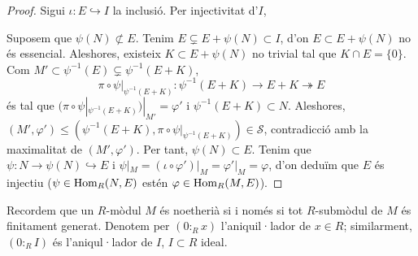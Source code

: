 \begin{lema}
\begin{proof}
        Sigui $\iota:E\hookrightarrow I$ la inclusió. Per injectivitat d'$I$,
        \begin{center}
        \end{center}
        Suposem que $\psi(N)\not\subset E$. Tenim $E\subsetneq E+\psi(N)\subset I$, d'on $E\subset E+\psi(N)$ no és essencial. Aleshores, existeix $K\subset E+\psi(N)$ no trivial tal que $K\cap E=\{0\}$. Com $M'\subset\psi^{-1}(E)\subsetneq\psi^{-1}(E+K)$,
        \begin{equation*}
            \pi\circ\psi|_{\psi^{-1}(E+K)}:\psi^{-1}(E+K)\rightarrow E+K\twoheadrightarrow E
        \end{equation*}
        és tal que $(\pi\circ\psi|_{\psi^{-1}(E+K)})|_{M'}=\varphi'$ i $\psi^{-1}(E+K)\subset N$. Aleshores, $(M',\varphi')\leq(\psi^{-1}(E+K),\pi\circ\psi|_{\psi^{-1}(E+K)})\in\mathcal{S}$, contradicció amb la maximalitat de $(M',\varphi')$.\newline
        Per tant, $\psi(N)\subset E$. Tenim que $\psi:N\rightarrow\psi(N)\hookrightarrow E$ i $\psi|_{M}=(\iota\circ\varphi')|_{M}=\varphi'|_{M}=\varphi$, d'on deduïm que $E$ és injectiu ($\psi\in\operatorname{Hom}_{R}(N,E)$ estén $\varphi\in\operatorname{Hom}_{R}(M,E)$).
    \end{proof}
\end{lema}
Recordem que un $R$-mòdul $M$ és noetherià si i només si tot $R$-submòdul de $M$ és finitament generat. Denotem per $(0:_{R}x)$ l'aniquil·lador de $x\in R$; similarment, $(0:_{R}I)$ és l'aniqul·lador de $I$, $I\subset R$ ideal.
